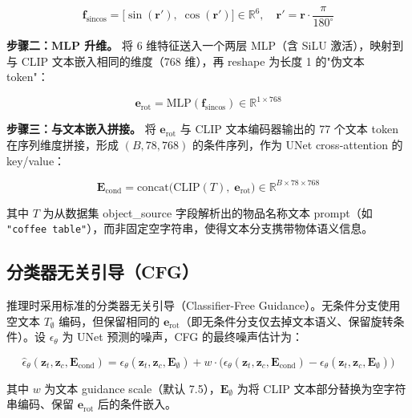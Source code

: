 \begin{equation}
    \mathbf{f}_{\text{sincos}} = \bigl[\sin(\mathbf{r}'),\; \cos(\mathbf{r}')\bigr] \in \mathbb{R}^{6},\quad \mathbf{r}' = \mathbf{r} \cdot \frac{\pi}{180^\circ}
\end{equation}

\textbf{步骤二：MLP 升维。} 将 6 维特征送入一个两层 MLP（含 SiLU 激活），映射到与 CLIP 文本嵌入相同的维度（768 维），再 reshape 为长度 1 的"伪文本 token"：

\begin{equation}
    \mathbf{e}_{\text{rot}} = \text{MLP}(\mathbf{f}_{\text{sincos}}) \in \mathbb{R}^{1 \times 768}
\end{equation}

\textbf{步骤三：与文本嵌入拼接。} 将 $\mathbf{e}_{\text{rot}}$ 与 CLIP 文本编码器输出的 77 个文本 token 在序列维度拼接，形成 $(B, 78, 768)$ 的条件序列，作为 UNet cross-attention 的 key/value：

\begin{equation}
    \mathbf{E}_{\text{cond}} = \text{concat}\bigl(\text{CLIP}(T),\; \mathbf{e}_{\text{rot}}\bigr) \in \mathbb{R}^{B \times 78 \times 768}
\end{equation}

其中 $T$ 为从数据集 object\_source 字段解析出的物品名称文本 prompt（如 \texttt{"coffee table"}），而非固定空字符串，使得文本分支携带物体语义信息。

\subsection{分类器无关引导（CFG）}

推理时采用标准的分类器无关引导（Classifier-Free Guidance）。无条件分支使用空文本 $T_{\emptyset}$ 编码，但保留相同的 $\mathbf{e}_{\text{rot}}$（即无条件分支仅去掉文本语义、保留旋转条件）。设 $\epsilon_\theta$ 为 UNet 预测的噪声，CFG 的最终噪声估计为：

\begin{equation}
    \hat{\epsilon}_\theta(\mathbf{z}_t, \mathbf{z}_c, \mathbf{E}_{\text{cond}}) = \epsilon_\theta(\mathbf{z}_t, \mathbf{z}_c, \mathbf{E}_{\emptyset}) + w \cdot \bigl(\epsilon_\theta(\mathbf{z}_t, \mathbf{z}_c, \mathbf{E}_{\text{cond}}) - \epsilon_\theta(\mathbf{z}_t, \mathbf{z}_c, \mathbf{E}_{\emptyset})\bigr)
\end{equation}

其中 $w$ 为文本 guidance scale（默认 7.5），$\mathbf{E}_{\emptyset}$ 为将 CLIP 文本部分替换为空字符串编码、保留 $\mathbf{e}_{\text{rot}}$ 后的条件嵌入。

